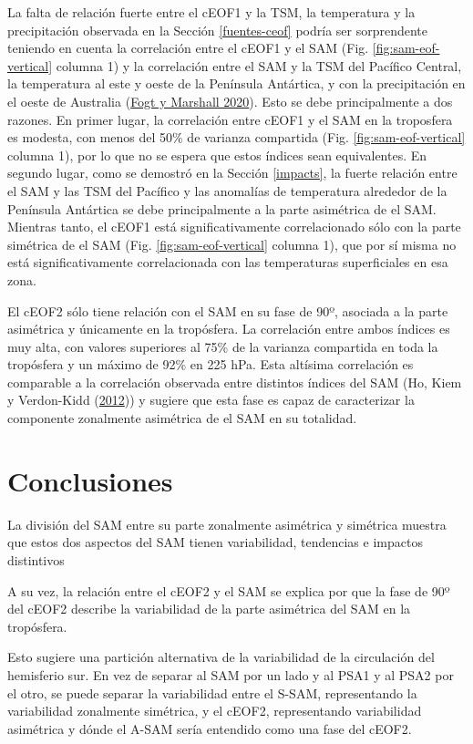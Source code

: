 \documentclass[12pt,oneside,a4paper]{reedthesis}
\begin{document}
La falta de relación fuerte entre el cEOF1 y la TSM, la temperatura y la precipitación observada en la Sección \ref{fuentes-ceof} podría ser sorprendente teniendo en cuenta la correlación entre el cEOF1 y el SAM (Fig. \ref{fig:sam-eof-vertical} columna 1) y la correlación entre el SAM y la TSM del Pacífico Central, la temperatura al este y oeste de la Península Antártica, y con la precipitación en el oeste de Australia (\protect\hyperlink{ref-fogt2020}{Fogt y Marshall 2020}).
Esto se debe principalmente a dos razones.
En primer lugar, la correlación entre cEOF1 y el SAM en la troposfera es modesta, con menos del 50\% de varianza compartida (Fig. \ref{fig:sam-eof-vertical} columna 1), por lo que no se espera que estos índices sean equivalentes.
En segundo lugar, como se demostró en la Sección \ref{impacts}, la fuerte relación entre el SAM y las TSM del Pacífico y las anomalías de temperatura alrededor de la Península Antártica se debe principalmente a la parte asimétrica de el SAM.
Mientras tanto, el cEOF1 está significativamente correlacionado sólo con la parte simétrica de el SAM (Fig. \ref{fig:sam-eof-vertical} columna 1), que por sí misma no está significativamente correlacionada con las temperaturas superficiales en esa zona.

El cEOF2 sólo tiene relación con el SAM en su fase de 90º, asociada a la parte asimétrica y únicamente en la tropósfera.
La correlación entre ambos índices es muy alta, con valores superiores al 75\% de la varianza compartida en toda la tropósfera y un máximo de 92\% en 225 hPa.
Esta altísima correlación es comparable a la correlación observada entre distintos índices del SAM (Ho, Kiem y Verdon-Kidd (\protect\hyperlink{ref-ho2012}{2012})) y sugiere que esta fase es capaz de caracterizar la componente zonalmente asimétrica de el SAM en su totalidad.

\hypertarget{conclusiones-1}{%
\section{Conclusiones}\label{conclusiones-1}}

La división del SAM entre su parte zonalmente asimétrica y simétrica muestra que estos dos aspectos del SAM tienen variabilidad, tendencias e impactos distintivos

A su vez, la relación entre el cEOF2 y el SAM se explica por que la fase de 90º del cEOF2 describe la variabilidad de la parte asimétrica del SAM en la tropósfera.

Esto sugiere una partición alternativa de la variabilidad de la circulación del hemisferio sur.
En vez de separar al SAM por un lado y al PSA1 y al PSA2 por el otro, se puede separar la variabilidad entre el S-SAM, representando la variabilidad zonalmente simétrica, y el cEOF2, representando variabilidad asimétrica y dónde el A-SAM sería entendido como una fase del cEOF2.
\end{document}
